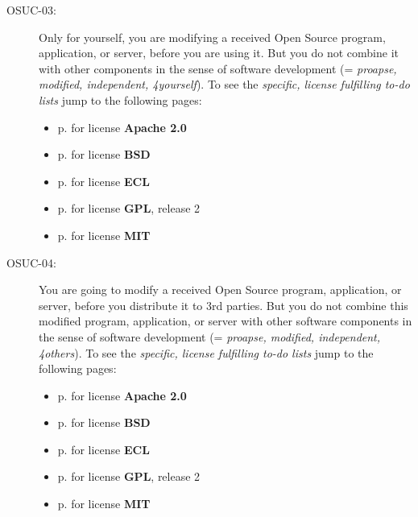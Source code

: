\begin{description}
\item[OSUC-03:]\label{OSUC-03-DEF} Only for yourself, you are modifying a
received Open Source program, application, or server, before you are using it.
But you do not combine it with other components in the sense of software
development (= \textit{proapse, modified, independent, 4yourself}).
To see the \textit{specific, license fulfilling to-do lists} jump to the
following pages:
  \begin{itemize}
    \item p. \pageref{OSUC-03-Apache20} for license \textbf{Apache 2.0}
    \item p. \pageref{OSUC-03-BSD} for license \textbf{BSD}
    \item p. \pageref{OSUC-03-ECL} for license \textbf{ECL}
    \item p. \pageref{OSUC-03-GPL2X} for license \textbf{GPL}, release 2
    \item p. \pageref{OSUC-03-MIT} for license \textbf{MIT}
  \end{itemize}

\item[OSUC-04:]\label{OSUC-04-DEF} You are going to modify a received Open
Source program, application, or server, before you distribute it to 3rd parties.
But you do not combine this modified program, application, or server with other
software components in the sense of software development (= \textit{proapse,
modified, independent, 4others}).
To see the \textit{specific, license fulfilling to-do lists} jump to the
following pages:
  \begin{itemize}
    \item p. \pageref{OSUC-04-Apache20} for license \textbf{Apache 2.0}
    \item p. \pageref{OSUC-04-BSD} for license \textbf{BSD}
    \item p. \pageref{OSUC-04-ECL} for license \textbf{ECL}
    \item p. \pageref{OSUC-04-GPL2X} for license \textbf{GPL}, release 2
    \item p. \pageref{OSUC-04-MIT} for license \textbf{MIT}
  \end{itemize}


\end{description}
